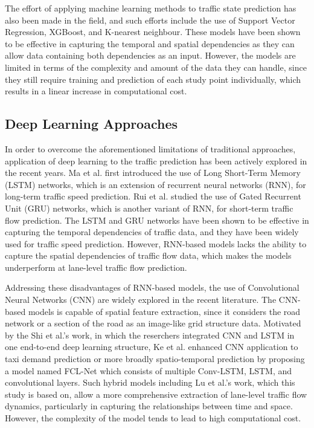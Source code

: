 \documentclass[11pt]{uonthesis}
\begin{document}
The effort of applying machine learning methods to traffic state prediction has also been made in the field, and such efforts include the use of Support Vector Regression\cite{svr}, XGBoost\cite{xgboost}, and K-nearest neighbour\cite{knn}. These models have been shown to be effective in capturing the temporal and spatial dependencies as they can allow data containing both dependencies as an input. However, the models are limited in terms of the complexity and amount of the data they can handle, since they still require training and prediction of each study point individually, which results in a linear increase in computational cost.

\subsection{Deep Learning Approaches}

In order to overcome the aforementioned limitations of traditional approaches, application of deep learning to the traffic prediction has been actively explored in the recent years. Ma et al. first introduced the use of Long Short-Term Memory (LSTM) networks, which is an extension of recurrent neural networks (RNN), for long-term traffic speed prediction\cite{ma2015lstm}. Rui et al. studied the use of Gated Recurrent Unit (GRU) networks, which is another variant of RNN, for short-term traffic flow prediction\cite{rui2017gru}. The LSTM and GRU networks have been shown to be effective in capturing the temporal dependencies of traffic data, and they have been widely used for traffic speed prediction. However, RNN-based models lacks the ability to capture the spatial dependencies of traffic flow data, which makes the models underperform at lane-level traffic flow prediction. 

Addressing these disadvantages of RNN-based models, the use of Convolutional Neural Networks (CNN) are widely explored in the recent literature\cite{macnnimage}\cite{cnnzhang}. The CNN-based models is capable of spatial feature extraction, since it considers the road network or a section of the road as an image-like grid structure data. Motivated by the Shi et al.'s work\cite{convlstm}, in which the reserchers integrated CNN and LSTM in one end-to-end deep learning structure, Ke et al.\cite{FCL} enhanced CNN application to taxi demand prediction or more broadly spatio-temporal prediction by proposing a model named FCL-Net which consists of multiple Conv-LSTM, LSTM, and convolutional layers. Such hybrid models including Lu et al.'s work, which this study is based on, allow a more comprehensive extraction of lane-level traffic flow dynamics, particularly in capturing the relationships between time and space. However, the complexity of the model tends to lead to high computational cost.
\end{document}
